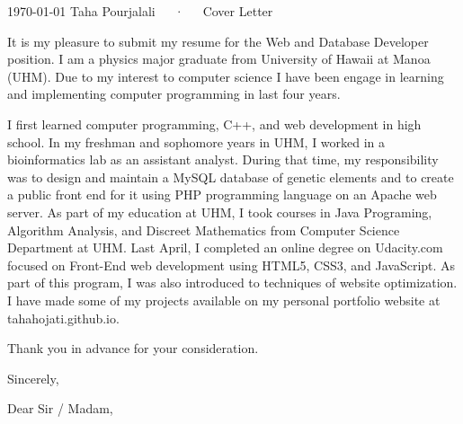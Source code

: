 \documentclass[11pt, a4paper]{awesome-cv}
\begin{document}
\makecvheader

\makecvfooter
  {\today}
  {Taha Pourjalali~~~·~~~Cover Letter}
  {}

\makelettertitle

\begin{cvletter}

It is my pleasure to submit my resume for the Web and Database Developer position. I am a physics major graduate from University of Hawaii at Manoa (UHM). Due to my interest to computer science I have been engage in learning and implementing computer programming in last four years.

I first learned computer programming, C++, and web development in high school.  In my freshman and sophomore years in UHM, I worked in a bioinformatics lab as an assistant analyst. During that time, my responsibility was to design and maintain a MySQL database of genetic elements and to create a public front end for it using PHP programming language on an Apache web server. As part of my education at UHM, I took courses in Java Programing, Algorithm Analysis, and Discreet Mathematics from Computer Science Department at UHM.  Last April, I completed an online degree on Udacity.com focused on Front-End web development using HTML5, CSS3, and JavaScript. As part of this program, I was also introduced to techniques of website optimization. I have made some of my projects available on my personal portfolio website at tahahojati.github.io.


Thank you in advance for your consideration.


Sincerely,

Dear Sir / Madam,


\end{cvletter}
\end{document}
